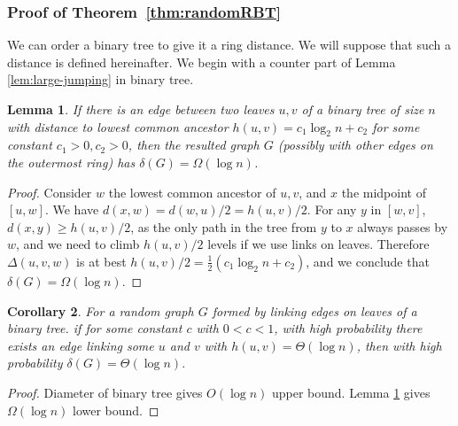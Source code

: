 \documentclass[11pt]{article}
\newtheorem{lem}{Lemma}
\newtheorem{coro}[lem]{Corollary}
\begin{document}


\subsubsection{Proof of Theorem~\ref{thm:randomRBT}}

We can order a binary tree to give it a ring distance. We will suppose that such a distance is defined hereinafter. We begin with a counter part of Lemma \ref{lem:large-jumping} in binary tree.

\begin{lem}\label{lem:large-jump-binary}
If there is an edge between two leaves $u,v$ of a binary tree of size $n$ with distance to lowest common ancestor $h(u,v)=c_1 \log_2 n + c_2$ for some constant $c_1>0, c_2>0$, then the resulted graph $G$ (possibly with other edges on the outermost ring) has $\delta(G) = \Omega(\log n)$.
\end{lem}

\begin{proof}
Consider $w$ the lowest common ancestor of $u,v$, and $x$ the midpoint of $[u,w]$. We have $d(x,w)=d(w,u)/2=h(u,v)/2$. For any $y$ in $[w,v]$, $d(x,y) \geq h(u,v)/2$, as the only path in the tree from $y$ to $x$ always passes by $w$, and we need to climb $h(u,v)/2$ levels if we use links on leaves. Therefore $\Delta(u,v,w)$ is at best $h(u,v)/2=\frac{1}{2}(c_1 \log_2 n + c_2)$, and we conclude that $\delta(G) = \Omega(\log n)$.
\end{proof}

\begin{coro}\label{coro:large-jump-binary}
For a random graph $G$ formed by linking edges on leaves of a binary tree.
	if for some constant $c$ with $0 < c < 1$, 
	with high probability there exists an edge linking some $u$ and 
	$v$ with $h(u,v)=\Theta(\log n)$, 
	then with high probability $\delta(G)=\Theta(\log n)$.
\end{coro}

\begin{proof}
Diameter of binary tree gives $O(\log n)$ upper bound. Lemma \ref{lem:large-jump-binary} gives $\Omega(\log n)$ lower bound.
\end{proof}
\end{document}
